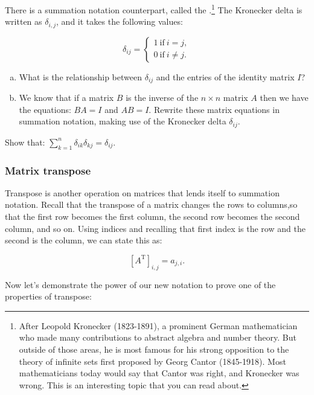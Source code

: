 There is a summation notation counterpart, called the .\footnote{After Leopold Kronecker (1823-1891), a prominent German mathematician who made many contributions to abstract algebra and number theory. But outside of those areas, he is most famous for his strong opposition to the theory of infinite sets first proposed by Georg Cantor (1845-1918).  Most mathematicians today would say that Cantor was right, and Kronecker was wrong. This is an interesting topic that you can read about.} The Kronecker delta is written as $\delta_{i,j}$, and it takes the following values:

\[ \delta_{ij}=
\begin{cases}
1 ~ \text{if} ~ i=j,  \\
0 ~ \text{if} ~ i \neq j.
\end{cases} \]

\begin{exercise}{}
\begin{enumerate}[(a)]
\item
What is the relationship between $\delta_{ij}$ and  the entries of the identity matrix $I$?
\item
We know that if a matrix $B$ is the inverse of the $n \times n$ matrix $A$ then we have the equations: $BA = I$ and $AB = I$.  Rewrite these matrix equations in summation notation, making use of the Kronecker delta $\delta_{ij}$.
\end{enumerate}
\end{exercise}

\begin{exercise}{}
Show that: $\displaystyle{ \sum_{k=1}^n  \delta_{ik}\delta_{kj}=\delta_{ij}}.$
\end{exercise}


\subsubsection*{Matrix transpose}
Transpose is another operation on matrices that lends itself to summation notation.  Recall that the transpose of a matrix changes the rows to columns,so that the first row becomes the first column, the second row becomes the second column, and so on.   Using indices and recalling that first index is the row and the second is the column, we can state this as:

\[ \left[ {A}^{\text{T}} \right]_{i,j} = {a}_{j,i}. \]

Now let's demonstrate the power of our new notation to prove one of the properties of transpose:

